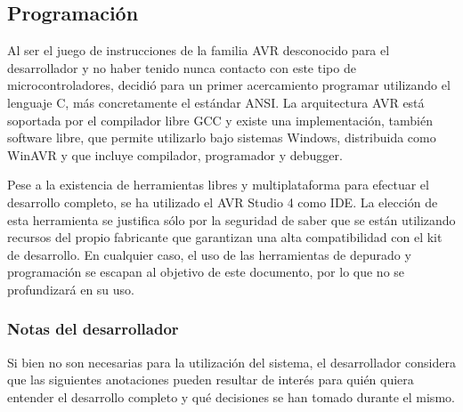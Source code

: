 \subsection{Programación}
\label{subsec:programacion}

Al ser el juego de instrucciones de la familia AVR desconocido para el desarrollador y no haber tenido nunca contacto con este tipo de microcontroladores, decidió para un primer acercamiento programar utilizando el lenguaje C, más concretamente el estándar ANSI. La arquitectura AVR está soportada por el compilador libre GCC\cite{gcc} y existe una implementación, también software libre, que permite utilizarlo bajo sistemas Windows, distribuida como WinAVR\cite{winavr} y que incluye compilador, programador y debugger.

Pese a la existencia de herramientas libres y multiplataforma para efectuar el desarrollo completo, se ha utilizado el AVR Studio 4\cite{avrstudio} como IDE. La elección de esta herramienta se justifica sólo por la seguridad de saber que se están utilizando recursos del propio fabricante que garantizan una alta compatibilidad con el kit de desarrollo. En cualquier caso, el uso de las herramientas de depurado y programación se escapan al objetivo de este documento, por lo que no se profundizará en su uso.

\subsubsection{Notas del desarrollador}

Si bien no son necesarias para la utilización del sistema, el desarrollador considera que las siguientes anotaciones pueden resultar de interés para quién quiera entender el desarrollo completo y qué decisiones se han tomado durante el mismo.

